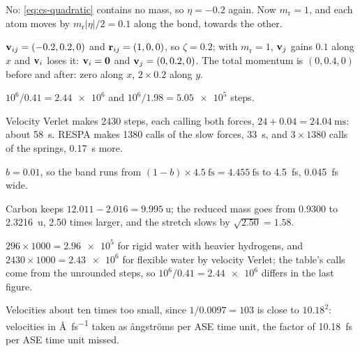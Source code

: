 \label{sec:cs-answers}

No: \cref{eq:cs-quadratic} contains no mass, so
$\eta = -0.2$ again. Now $m_{\mathrm r} = 1$, and each atom moves by
$m_{\mathrm r}\lvert\eta\rvert/2 = 0.1$ along the bond, towards the
other.

$\bm{\mathrm{v}}_{ij} = (-0.2, 0.2, 0)$ and $\bm{\mathrm{r}}_{ij} =
(1, 0, 0)$, so $\zeta = 0.2$; with $m_{\mathrm r} = 1$, $\bm{\mathrm{v}}_j$ gains
$0.1$ along $x$ and $\bm{\mathrm{v}}_i$ loses it: $\bm{\mathrm{v}}_i = \bm{\mathrm{0}}$ and $\bm{\mathrm{v}}_j
= (0, 0.2, 0)$. The total momentum is $(0, 0.4, 0)$ before and after:
zero along $x$, $2\times0.2$ along $y$.

$10^6/0.41 = \num{2.44e6}$ and $10^6/1.98 =
\num{5.05e5}$ steps.

Velocity Verlet makes 2430 steps, each calling both
forces, $24 + 0.04 = \SI{24.04}{\milli\second}$: about \SI{58}{\second}.
RESPA makes 1380 calls of the slow forces, \SI{33}{\second}, and
$3\times1380$ calls of the springs, \SI{0.17}{\second} more.

$b = 0.01$, so the band runs from $(1 -
b)\times\SI{4.5}{\femto\second} = \SI{4.455}{\femto\second}$ to
\SI{4.5}{\femto\second}, \SI{0.045}{\femto\second} wide.

Carbon keeps $12.011 - 2.016 =
\SI{9.995}{\amu}$; the reduced mass goes from 0.9300 to
\SI{2.3216}{\amu}, 2.50 times larger, and the stretch slows by
$\sqrt{2.50} = 1.58$.

$296\times1000 = \num{2.96e5}$ for rigid water
with heavier hydrogens, and $2430\times1000 = \num{2.43e6}$ for flexible
water by velocity Verlet; the table's calls come from the unrounded steps,
so $10^6/0.41 = \num{2.44e6}$ differs in the last figure.

Velocities about ten times too small, since
$1/0.0097 = 103$ is close to $10.18^2$: velocities in
\si{\angstrom\per\femto\second} taken as \aa ngstr\"oms per ASE time
unit, the factor of \SI{10.18}{\femto\second} per ASE time unit
missed.
